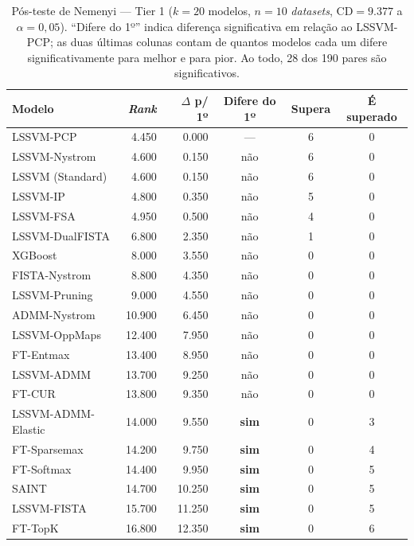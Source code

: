 \begin{table}[ht]
  \centering
  \caption{Pós-teste de Nemenyi --- Tier 1 ($k=20$ modelos, $n=10$ \textit{datasets}, $\mathrm{CD}=9.377$ a $\alpha=0{,}05$). ``Difere do 1º'' indica diferença significativa em relação ao LSSVM-PCP; as duas últimas colunas contam de quantos modelos cada um difere significativamente para melhor e para pior. Ao todo, 28 dos 190 pares são significativos.}
  \label{tab:tier1_nemenyi}
  \begin{tabular}{lrrccc}
    \toprule
    Modelo & \textit{Rank} & $\Delta$ p/ 1º & Difere do 1º & Supera & É superado \\
    \midrule
    LSSVM-PCP & 4.450 & 0.000 & --- & 6 & 0 \\
    LSSVM-Nystrom & 4.600 & 0.150 & não & 6 & 0 \\
    LSSVM (Standard) & 4.600 & 0.150 & não & 6 & 0 \\
    LSSVM-IP & 4.800 & 0.350 & não & 5 & 0 \\
    LSSVM-FSA & 4.950 & 0.500 & não & 4 & 0 \\
    LSSVM-DualFISTA & 6.800 & 2.350 & não & 1 & 0 \\
    XGBoost & 8.000 & 3.550 & não & 0 & 0 \\
    FISTA-Nystrom & 8.800 & 4.350 & não & 0 & 0 \\
    LSSVM-Pruning & 9.000 & 4.550 & não & 0 & 0 \\
    ADMM-Nystrom & 10.900 & 6.450 & não & 0 & 0 \\
    LSSVM-OppMaps & 12.400 & 7.950 & não & 0 & 0 \\
    FT-Entmax & 13.400 & 8.950 & não & 0 & 0 \\
    LSSVM-ADMM & 13.700 & 9.250 & não & 0 & 0 \\
    FT-CUR & 13.800 & 9.350 & não & 0 & 0 \\
    LSSVM-ADMM-Elastic & 14.000 & 9.550 & \textbf{sim} & 0 & 3 \\
    FT-Sparsemax & 14.200 & 9.750 & \textbf{sim} & 0 & 4 \\
    FT-Softmax & 14.400 & 9.950 & \textbf{sim} & 0 & 5 \\
    SAINT & 14.700 & 10.250 & \textbf{sim} & 0 & 5 \\
    LSSVM-FISTA & 15.700 & 11.250 & \textbf{sim} & 0 & 5 \\
    FT-TopK & 16.800 & 12.350 & \textbf{sim} & 0 & 6 \\
    \bottomrule
  \end{tabular}
\end{table}

